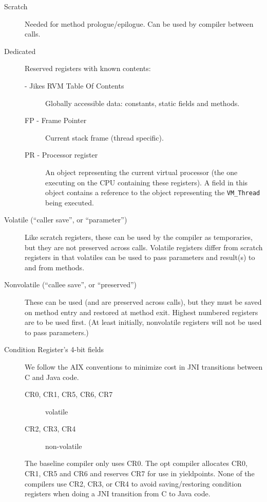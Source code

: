 \begin{description}
\item[Scratch]
     Needed for method prologue/epilogue.  Can be used by compiler between
     calls.

\item[Dedicated]
     Reserved registers with known contents:
\begin{description}
\item[ - Jikes RVM Table Of Contents]
        Globally accessible data: constants, static fields and methods.

\item[FP - Frame Pointer]
        Current stack frame (thread specific).

\item[PR - Processor register]
        An object representing the current virtual processor (the one
        executing on the CPU containing these registers).  A field in
        this object contains a reference to the object representing
        the {\tt VM\_Thread} being executed.
\end{description}

\item[Volatile (``caller save'', or ``parameter'')]
     Like scratch registers, these can be used by the compiler as
     temporaries, but they are not preserved across calls.  Volatile
     registers differ from scratch registers in that volatiles
     can be used to pass parameters and result(s) to and from
     methods.

\item[Nonvolatile (``callee save'', or ``preserved'')]
     These can be used (and are preserved across calls), but they must be
     saved on method entry and restored at method exit.  Highest numbered
     registers are to be used first.  (At least initially, nonvolatile
     registers will not be used to pass parameters.)

\item[Condition Register's 4-bit fields]
We follow the AIX conventions to minimize cost in JNI transitions
between C and Java code. 
\begin{description}
\item[CR0, CR1, CR5, CR6, CR7] volatile
\item[CR2, CR3, CR4] non-volatile
\end{description}
The baseline compiler only uses CR0.  The opt compiler allocates CR0,
CR1, CR5 and CR6 and reserves CR7 for use in yieldpoints.  None of the
compilers use CR2, CR3, or CR4 to avoid saving/restoring condition
registers when doing a JNI transition from C to Java code. 
\end{description}



